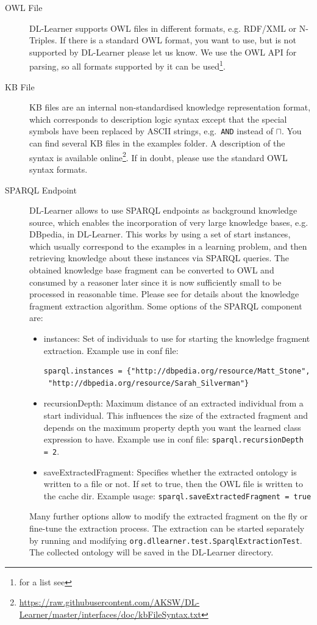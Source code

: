 \documentclass[a4paper,12pt]{scrartcl}
\begin{document}
\begin{description}
 \item[OWL File] DL-Learner supports OWL files in different formats, e.g. RDF/XML or N-Triples. If there is a standard OWL format, you want to use, but is not supported by DL-Learner please let us know. We use the OWL API for parsing, so all formats supported by it can be used\footnote{ for a list see \owlapi}.
 \item[KB File] KB files are an internal non-standardised knowledge representation format, which corresponds to description logic syntax except that the special symbols have been replaced by ASCII strings, e.g.~\verb|AND| instead of $\sqcap$. You can find several KB files in the examples folder. A description of the syntax is available online\footnote{\url{https://raw.githubusercontent.com/AKSW/DL-Learner/master/interfaces/doc/kbFileSyntax.txt}}. If in doubt, please use the standard OWL syntax formats.
 \item[SPARQL Endpoint] DL-Learner allows to use SPARQL endpoints as background knowledge source, which enables the incorporation of very large knowledge bases, e.g. DBpedia\cite{2008_dbpedia}, in DL-Learner. This works by using a set of start instances, which usually correspond to the examples in a learning problem, and then retrieving knowledge about these instances via SPARQL queries. The obtained knowledge base fragment can be converted to OWL and consumed by a reasoner later since it is now sufficiently small to be processed in reasonable time. Please see \cite{2009_ijswis} for details about the knowledge fragment extraction algorithm. Some options of the SPARQL component are:
\begin{itemize}
 \item instances: Set of individuals to use for starting the knowledge fragment extraction. Example use in conf file: \begin{verbatim}sparql.instances = {"http://dbpedia.org/resource/Matt_Stone",
 "http://dbpedia.org/resource/Sarah_Silverman"}\end{verbatim}
 \item recursionDepth: Maximum distance of an extracted individual from a start individual. This influences the size of the extracted fragment and depends on the maximum property depth you want the learned class expression to have. Example use in conf file: \verb|sparql.recursionDepth = 2|.
\item saveExtractedFragment: Specifies whether the extracted ontology is written to a file or not. If set to true, then the OWL file is written to the cache dir. Example usage: \verb|sparql.saveExtractedFragment = true|
\end{itemize}
 Many further options allow to modify the extracted fragment on the fly or fine-tune the extraction process.
The extraction can be started separately by running and modifying \verb|org.dllearner.test.SparqlExtractionTest|. The collected ontology will be saved in the DL-Learner directory.
\end{description}
\end{document}
